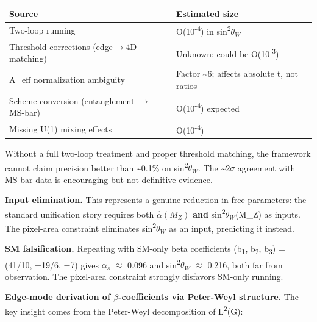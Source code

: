 \documentclass[11pt,a4paper]{article}
\theoremstyle{remark}
\begin{document}
{\def\LTcaptype{none} %
\begin{longtable}[]{@{}
  >{\raggedright\arraybackslash}p{}
  >{\raggedright\arraybackslash}p{}@{}}
\toprule\noalign{}
\begin{minipage}[b]{\linewidth}\raggedright
Source
\end{minipage} & \begin{minipage}[b]{\linewidth}\raggedright
Estimated size
\end{minipage} \\
\midrule\noalign{}
\endhead
\bottomrule\noalign{}
\endlastfoot
Two-loop running & O(10\textsuperscript{-4}) in sin\textsuperscript{2}\(\theta_W\) \\
Threshold corrections (edge\ensuremath{\to}4D matching) & Unknown; could be O(10\textsuperscript{-3}) \\
A\_eff normalization ambiguity & Factor \textasciitilde6; affects absolute t, not ratios \\
Scheme conversion (entanglement \ensuremath{\to} MS-bar) & O(10\textsuperscript{-4}) expected \\
Missing U(1) mixing effects & O(10\textsuperscript{-4}) \\
\end{longtable}
}

Without a full two-loop treatment and proper threshold matching, the
framework cannot claim precision better than \textasciitilde0.1\% on sin\textsuperscript{2}\(\theta_W\). The \textasciitilde2\ensuremath{\sigma}
agreement with MS-bar data is encouraging but not definitive evidence.

\textbf{Input elimination.} This represents a genuine reduction in free parameters:
the standard unification story requires both \(\hat{\alpha}(M_Z)\) \textbf{and}
sin\textsuperscript{2}\(\theta_W\)(M\_Z) as inputs. The pixel-area constraint eliminates sin\textsuperscript{2}\(\theta_W\) as an
input, predicting it instead.

\textbf{SM falsification.} Repeating with SM-only beta coefficients
(b\textsubscript{1}, b\textsubscript{2}, b\textsubscript{3}) = (41/10, \ensuremath{-}19/6, \ensuremath{-}7) gives \(\alpha_s\) \ensuremath{\approx} 0.096 and sin\textsuperscript{2}\(\theta_W\) \ensuremath{\approx} 0.216,
both far from observation. The pixel-area constraint strongly disfavors
SM-only running.

\textbf{Edge-mode derivation of \ensuremath{\beta}-coefficients via Peter-Weyl structure.} The key insight comes from the Peter-Weyl decomposition of L\textsuperscript{2}(G):
\end{document}

